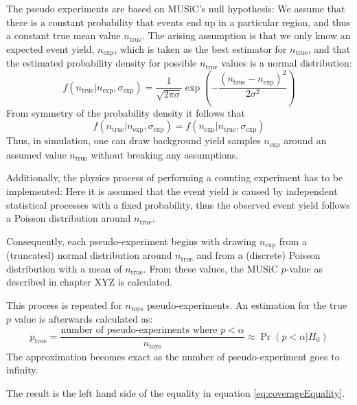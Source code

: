 The pseudo experiments are based on \acs{MUSiC}'s null hypothesis: We assume that there is a constant probability that events end up in a particular region, and thus a constant true mean value $n_\text{true}$. 
The arising assumption is that we only know an expected event yield, $n_\text{exp}$, which is taken as the best estimator for $n_\text{true}$, and that the estimated probability density for possible $n_\text{true}$ values is a normal distribution:
\begin{equation}
	f( n_\text{true} | n_\text{exp}, \sigma_\text{exp} ) = \frac{1}{\sqrt{2 \pi \sigma}} \exp\left(-\frac{(n_\text{true} - n_\text{exp})^2}{2\sigma^2}\right)
\end{equation} 
From symmetry of the probability density it follows that 
\begin{equation}
	f( n_\text{true} | n_\text{exp}, \sigma_\text{exp} ) = f( n_\text{exp} | n_\text{true}, \sigma_\text{exp} )
\end{equation}	
Thus, in simulation, one can draw background yield samples $n_\text{exp}$ around an assumed value $n_\text{true}$ without breaking any assumptions.

Additionally, the physics process of performing a counting experiment has to be implemented: Here it is assumed that the event yield is caused by independent statistical processes with a fixed probability, thus the observed event yield follows a Poisson distribution around $n_\text{true}$.

Consequently, each pseudo-experiment begins with drawing $n_\text{exp}$ from a (truncated) normal distribution around $n_\text{true}$ and from a (discrete) Poisson distribution with a mean of $n_\text{true}$. From these values, the \ac{MUSiC} $p$-value as described in chapter XYZ is calculated.

This process is repeated for $n_\text{toys}$ pseudo-experiments. An estimation for the true $p$ value is afterwards calculated as:
\begin{equation}
	p_\text{true} = \frac{\text{number of pseudo-experiments where $p < \alpha$}}{n_\text{toys}} \approx \Pr(p < \alpha | H_0)
\end{equation}
The approximation becomes exact as the number of pseudo-experiment goes to infinity.

The result is the left hand side of the equality in equation \ref{eq:coverageEquality}.

